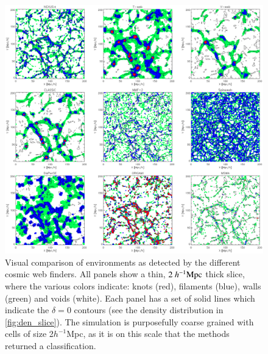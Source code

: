 \begin{figure}
 \includegraphics[width=\textwidth]{Chapter3b/FIGS/fig1v4a.eps}
 \vspace{-.4cm}
 \caption{Visual comparison of environments as detected by the different cosmic web finders. All panels show a thin, $2~h^{-1}\rm Mpc$ thick slice, where the various colors indicate: knots (red), filaments (blue), walls (green) and voids (white). Each panel has a set of solid lines which indicate the $\delta=0$ contours (see the density distribution in \autoref{fig:den_slice}). The simulation is purposefully coarse grained with cells of size 2$h^{-1}$Mpc, as it is on this scale that the methods returned a classification.}
 \label{fig:env_slice_a}
\end{figure}


